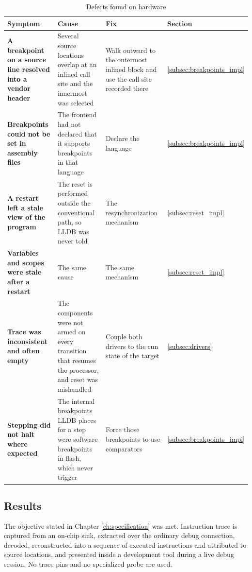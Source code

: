 \begin{table}[htbp]
    \centering
    \caption{Defects found on hardware}
    \label{tab:defects}
    \begin{tabularx}{\linewidth}{| @{}>{\hsize\bfseries}Y | >{\hsize}Y | >{\hsize}Y | >{\hsize}Y@{} |}
        \hline
        Symptom & \textbf{Cause} & \textbf{Fix} & \textbf{Section} \\
        \hline
        A breakpoint on a source line resolved into a vendor header & Several source locations overlap at an inlined call site and the innermost was selected & Walk outward to the outermost inlined block and use the call site recorded there & \ref{subsec:breakpoints_impl} \\
        \hline
        Breakpoints could not be set in assembly files & The frontend had not declared that it supports breakpoints in that language & Declare the language & \ref{subsec:breakpoints_impl} \\
        \hline
        A restart left a stale view of the program & The reset is performed outside the conventional path, so LLDB was never told & The resynchronization mechanism & \ref{subsec:reset_impl} \\
        \hline
        Variables and scopes were stale after a restart & The same cause & The same mechanism & \ref{subsec:reset_impl} \\
        \hline
        Trace was inconsistent and often empty & The components were not armed on every transition that resumes the processor, and reset was mishandled & Couple both drivers to the run state of the target & \ref{subsec:drivers} \\
        \hline
        Stepping did not halt where expected & The internal breakpoints LLDB places for a step were software breakpoints in flash, which never trigger & Force those breakpoints to use comparators & \ref{subsec:breakpoints_impl} \\
        \hline
    \end{tabularx}
\end{table}

\subsection{Results}
The objective stated in Chapter \ref{ch:specification} was met. Instruction trace is captured from an on-chip sink, extracted over the ordinary debug connection, decoded, reconstructed into a sequence of executed instructions and attributed to source locations, and presented inside a development tool during a live debug session. No trace pins and no specialized probe are used.

